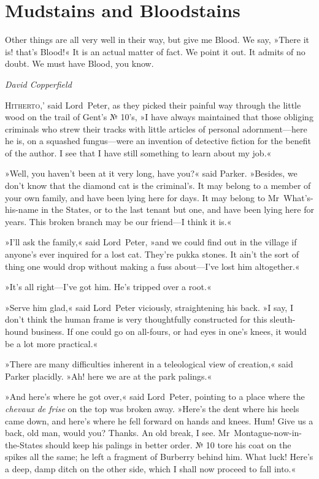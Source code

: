 \chapter{Mudstains and Bloodstains}

\epigraph{Other things are all very well in their way, but give me Blood\textellipsis . We say, »There it is! that's Blood!« It is an actual matter of fact. We point it out. It admits of no doubt\textellipsis . We must have Blood, you know.}{\textit{David Copperfield}}


\lettrine[lines=4,ante=`]{H}{itherto,}' said Lord~Peter, as they picked their painful way through the little wood on the trail of Gent's № 10's, »I have always maintained that those obliging criminals who strew their tracks with little articles of personal adornment—here he is, on a squashed fungus—were an invention of detective fiction for the benefit of the author. I see that I have still something to learn about my job.«

»Well, you haven't been at it very long, have you?« said Parker.  »Besides, we don't know that the diamond cat is the criminal's. It may belong to a member of your own family, and have been lying here for days. It may belong to Mr~What's-his-name in the States, or to the last tenant but one, and have been lying here for years. This broken branch may be our friend—I think it is.«

»I'll ask the family,« said Lord~Peter, »and we could find out in the village if anyone's ever inquired for a lost cat. They're pukka stones. It ain't the sort of thing one would drop without making a fuss about—I've lost him altogether.«

»It's all right—I've got him. He's tripped over a root.«

»Serve him glad,« said Lord~Peter viciously, straightening his back.  »I say, I don't think the human frame is very thoughtfully constructed for this sleuth-hound business. If one could go on all-fours, or had eyes in one's knees, it would be a lot more practical.«

»There are many difficulties inherent in a teleological view of creation,« said Parker placidly. »Ah! here we are at the park palings.«

»And here's where he got over,« said Lord~Peter, pointing to a place where the \textit{chevaux de frise} on the top was broken away. »Here's the dent where his heels came down, and here's where he fell forward on hands and knees. Hum! Give us a back, old man, would you? Thanks.  An old break, I see. Mr~Montague-now-in-the-States should keep his palings in better order. № 10 tore his coat on the spikes all the same; he left a fragment of Burberry behind him. What luck! Here's a deep, damp ditch on the other side, which I shall now proceed to fall into.«

